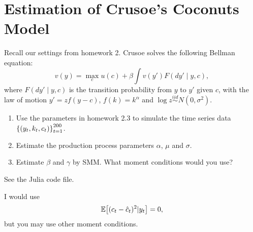 \documentclass[12pt]{article}
\begin{document}
\section{Estimation of Crusoe's Coconuts Model}
Recall our settings from homework 2. Crusoe solves the following Bellman equation: 
\begin{equation*}
    v(y) = \max_{c} u(c) + \beta \int v(y') F(dy'\mid y, c),
\end{equation*}
where $F(dy'\mid y, c)$ is the transition probability from $y$ to $y'$ given $c$, 
with the law of motion $y' = zf(y - c)$, $f(k) = k^\alpha$ and $\log z\overset{iid}{\sim} N(0, \sigma^2)$.
\begin{enumerate}
    \item Use the parameters in homework 2.3 to simulate the time series data 
    $\left\{ {(y_t, k_t, c_t)} \right\}_{t=1}^{200}$. 
    \item Estimate the production process parameters $\alpha$, $\mu$ and $\sigma$.  
    \item Estimate $\beta$ and $\gamma$ by SMM. What 
    moment conditions would you use? 
\end{enumerate}
\begin{sol}[1.1, 1.2]
    See the Julia code file.
\end{sol} 

\begin{sol}[1.3]
    I would use 
    \begin{equation*}
        \Ex{(c_t - \hat{c}_t)^2|y_t} = 0,
    \end{equation*}
    but you may use other moment conditions.
\end{sol}
\end{document}
